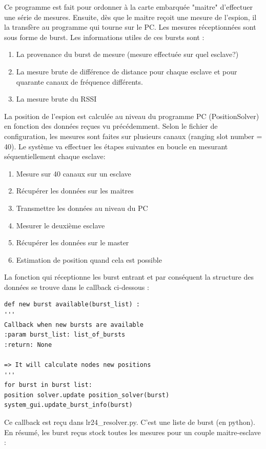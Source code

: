 Ce programme est fait pour ordonner à la carte embarquée "maitre" d'effectuer une série de mesures. Ensuite, dès que le maitre reçoit une mesure de l'espion, il la transfère au programme qui tourne sur le PC. Les mesures réceptionnées sont sous forme de burst. Les informations utiles de ces bursts sont : 

\begin{enumerate}
 \item La provenance du burst de mesure (mesure effectuée sur quel esclave?)
 \item La mesure brute de différence de distance pour chaque esclave et pour quarante canaux de fréquence différents.
 \item La mesure brute du RSSI 
\end{enumerate}

La position de l'espion est calculée au niveau du programme PC (PositionSolver) en fonction des données reçues vu précédemment. Selon le fichier de configuration, les mesures sont faites sur plusieurs canaux (ranging slot number = 40). Le système va effectuer les étapes suivantes en boucle en mesurant séquentiellement chaque esclave: 

\begin{enumerate}
 \item Mesure sur 40 canaux sur un esclave
 \item Récupérer les données sur les maitres
 \item Transmettre les données au niveau du PC
 \item Mesurer le deuxième esclave
 \item Récupérer les données sur le master
 \item Estimation de position quand cela est possible
\end{enumerate}

La fonction qui réceptionne les burst entrant et par conséquent la structure des données se trouve dans le callback ci-dessous :

\begin{lstlisting}
def new burst available(burst_list) :
'''
Callback when new bursts are available
:param burst_list: list_of_bursts
:return: None

=> It will calculate nodes new positions
'''
for burst in burst list:
position solver.update position_solver(burst)
system_gui.update_burst_info(burst)
\end{lstlisting}

Ce callback est reçu dans lr24\_resolver.py. C'est une liste de burst (en python). En résumé, les burst reçus stock toutes les mesures pour un couple maitre-esclave :

